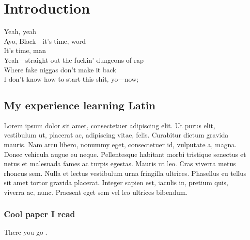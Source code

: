 
\Clear
\chapter{Introduction}
\label{cha:introduction}

Yeah, yeah \\
Ayo, Black—it's time, word \\
It's time, man \\
Yeah—straight out the fuckin' dungeons of rap \\
Where fake niggas don't make it back \\
I don't know how to start this shit, yo—now; \\

\section{My experience learning Latin}
\label{sec:my_experience_learning_latin}

Lorem ipsum dolor sit amet, consectetuer adipiscing elit. Ut purus elit, vestibulum ut, placerat ac, adipiscing vitae, felis. Curabitur dictum gravida mauris. Nam arcu libero, nonummy eget, consectetuer id, vulputate a, magna. Donec vehicula augue eu neque. Pellentesque habitant morbi tristique senectus et netus et malesuada fames ac
turpis egestas. Mauris ut leo. Cras viverra metus rhoncus sem. Nulla et lectus vestibulum urna fringilla ultrices. Phasellus eu tellus sit amet tortor gravida
placerat. Integer sapien est, iaculis in, pretium quis, viverra ac, nunc. Praesent eget sem vel leo ultrices bibendum.

\subsection{Cool paper I read}
\label{sub:cool_paper_i_read}

There you go \cite{Vonnegut:1975}.

